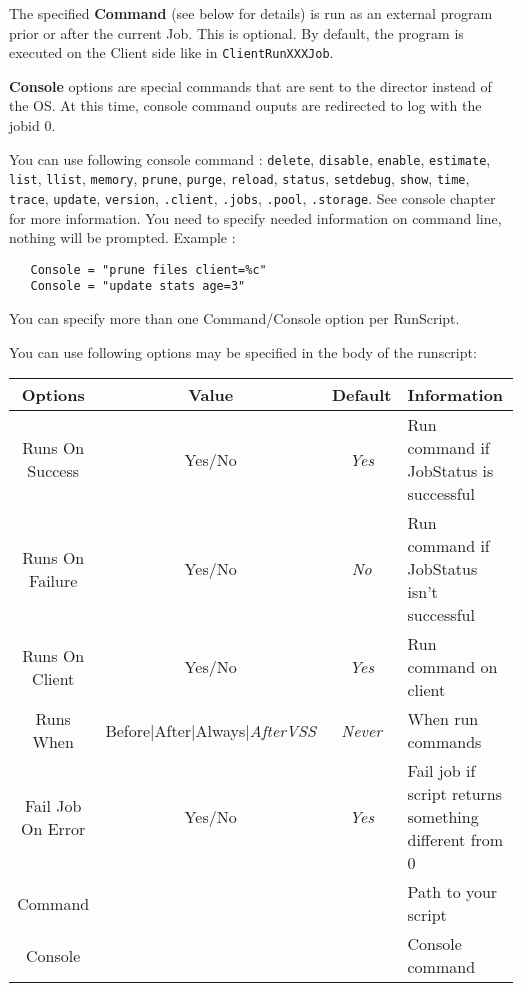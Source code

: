 \begin{description}
   The specified {\bf Command} (see below for details) is run as an external
   program prior or after the current Job.  This is optional.  By default, the
   program is executed on the Client side like in \texttt{ClientRunXXXJob}.

   \textbf{Console} options are special commands that are sent to the director instead
   of the OS. At this time, console command ouputs are redirected to log with
   the jobid 0.

   You can use following console command : \texttt{delete}, \texttt{disable},
   \texttt{enable}, \texttt{estimate}, \texttt{list}, \texttt{llist},
   \texttt{memory}, \texttt{prune}, \texttt{purge}, \texttt{reload},
   \texttt{status}, \texttt{setdebug}, \texttt{show}, \texttt{time},
   \texttt{trace}, \texttt{update}, \texttt{version}, \texttt{.client},
   \texttt{.jobs}, \texttt{.pool}, \texttt{.storage}.  See console chapter for
   more information. You need to specify needed information on command line, nothing
   will be prompted. Example :

\begin{verbatim}
   Console = "prune files client=%c"
   Console = "update stats age=3"
\end{verbatim}

   You can specify more than one Command/Console option per RunScript.

   You can use following options may be specified in the body
   of the runscript:\\

\begin{tabular}{|c|c|c|l}
Options         & Value  & Default & Information   \\
\hline
\hline
Runs On Success & Yes/No & {\it Yes} & Run command if JobStatus is successful\\
\hline
Runs On Failure & Yes/No & {\it No} & Run command if JobStatus isn't successful\\
\hline
Runs On Client  & Yes/No & {\it Yes} & Run command on client\\
\hline
Runs When       & Before|After|Always|\textsl{AfterVSS} & {\it Never} & When run commands\\
\hline
Fail Job On Error & Yes/No & {\it Yes} & Fail job if script returns 
                                          something different from 0 \\
\hline
Command          &       &          & Path to your script\\
\hline
Console          &       &          & Console command\\
\hline
\end{tabular}
   \\


\end{description}

